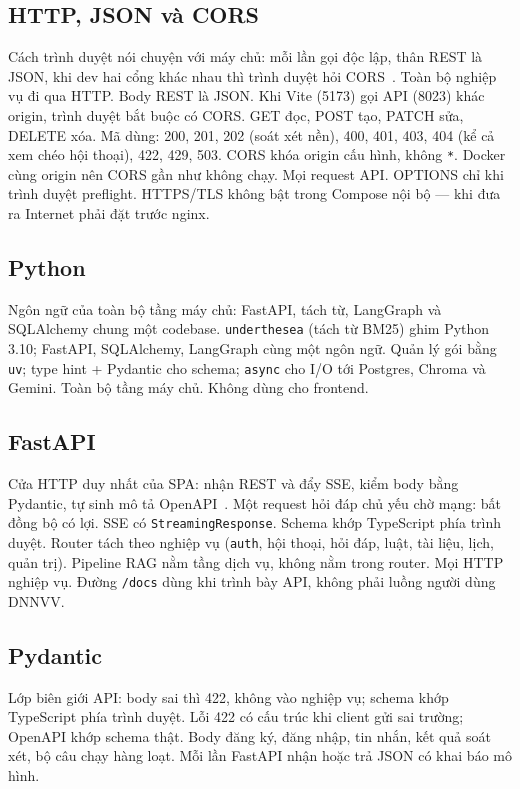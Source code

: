 \subsection{HTTP, JSON và CORS}

\boncau
{Cách trình duyệt nói chuyện với máy chủ: mỗi lần gọi độc lập, thân REST là
JSON, khi dev hai cổng khác nhau thì trình duyệt hỏi CORS~\cite{rfc9110}.}
{Toàn bộ nghiệp vụ đi qua HTTP. Body REST là JSON. Khi Vite (5173) gọi API
(8023) khác origin, trình duyệt bắt buộc có CORS.}
{GET đọc, POST tạo, PATCH sửa, DELETE xóa. Mã dùng: 200, 201, 202 (soát xét
nền), 400, 401, 403, 404 (kể cả xem chéo hội thoại), 422, 429, 503. CORS khóa
origin cấu hình, không \texttt{*}. Docker cùng origin nên CORS gần như không chạy.}
{Mọi request API. OPTIONS chỉ khi trình duyệt preflight. HTTPS/TLS không bật
trong Compose nội bộ --- khi đưa ra Internet phải đặt trước nginx.}

\subsection{Python}

\boncau
{Ngôn ngữ của toàn bộ tầng máy chủ: FastAPI, tách từ, LangGraph và SQLAlchemy
chung một codebase.}
{\texttt{underthesea} (tách từ BM25) ghim Python 3.10; FastAPI, SQLAlchemy,
LangGraph cùng một ngôn ngữ.}
{Quản lý gói bằng \texttt{uv}; type hint + Pydantic cho schema; \texttt{async}
cho I/O tới Postgres, Chroma và Gemini.}
{Toàn bộ tầng máy chủ. Không dùng cho frontend.}

\subsection{FastAPI}

\boncau
{Cửa HTTP duy nhất của SPA: nhận REST và đẩy SSE, kiểm body bằng Pydantic, tự
sinh mô tả OpenAPI~\cite{fastapi}.}
{Một request hỏi đáp chủ yếu chờ mạng: bất đồng bộ có lợi. SSE có
\texttt{StreamingResponse}. Schema khớp TypeScript phía trình duyệt.}
{Router tách theo nghiệp vụ (\texttt{auth}, hội thoại, hỏi đáp, luật, tài liệu,
lịch, quản trị). Pipeline RAG nằm tầng dịch vụ, không nằm trong router.}
{Mọi HTTP nghiệp vụ. Đường \texttt{/docs} dùng khi trình bày API, không phải
luồng người dùng DNNVV.}

\subsection{Pydantic}

\boncau
{Lớp biên giới API: body sai thì 422, không vào nghiệp vụ; schema khớp
TypeScript phía trình duyệt.}
{Lỗi 422 có cấu trúc khi client gửi sai trường; OpenAPI khớp schema thật.}
{Body đăng ký, đăng nhập, tin nhắn, kết quả soát xét, bộ câu chạy hàng loạt.}
{Mỗi lần FastAPI nhận hoặc trả JSON có khai báo mô hình.}

